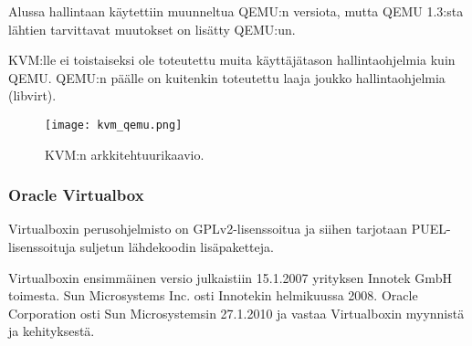 Alussa hallintaan käytettiin muunneltua QEMU:n versiota, mutta QEMU 1.3:sta lähtien tarvittavat muutokset on lisätty QEMU:un.

 KVM:lle ei toistaiseksi ole toteutettu muita käyttäjätason hallintaohjelmia kuin QEMU. QEMU:n päälle on kuitenkin toteutettu laaja joukko hallintaohjelmia (libvirt).


\begin{figure}[H]
\centering
\texttt{[image: kvm\_qemu.png]}
\caption{KVM:n arkkitehtuurikaavio.}
\end{figure}

\subsubsection{Oracle Virtualbox}


Virtualboxin perusohjelmisto on GPLv2-lisenssoitua ja siihen tarjotaan  PUEL-lisenssoituja suljetun lähdekoodin lisäpaketteja.

Virtualboxin ensimmäinen versio julkaistiin 15.1.2007 yrityksen Innotek GmbH toimesta. Sun Microsystems Inc. osti Innotekin helmikuussa 2008. Oracle Corporation osti Sun Microsystemsin 27.1.2010 ja vastaa Virtualboxin myynnistä ja kehityksestä.


